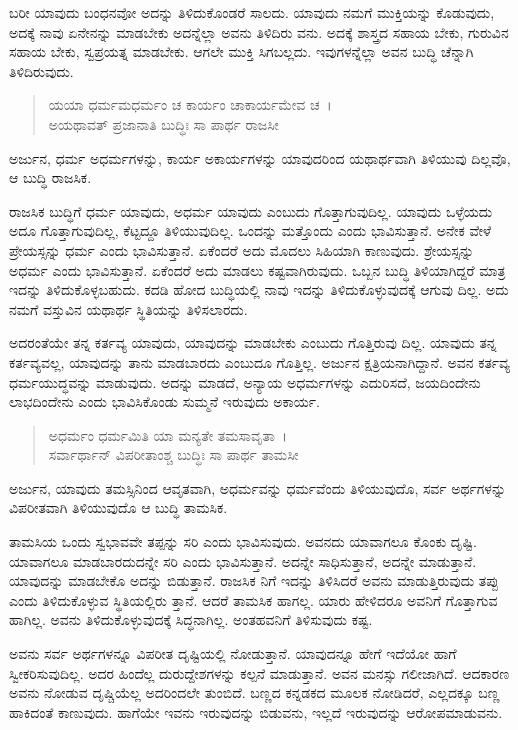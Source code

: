 ಬರೀ ಯಾವುದು ಬಂಧನವೋ ಅದನ್ನು ತಿಳಿದುಕೊಂಡರೆ ಸಾಲದು. ಯಾವುದು ನಮಗೆ ಮುಕ್ತಿಯನ್ನು ಕೊಡುವುದು, ಅದಕ್ಕೆ ನಾವು ಏನೇನನ್ನು ಮಾಡಬೇಕು ಅದನ್ನೆಲ್ಲಾ ಅವನು ತಿಳಿದಿರು ವನು. ಅದಕ್ಕೆ ಶಾಸ್ತ್ರದ ಸಹಾಯ ಬೇಕು, ಗುರುವಿನ ಸಹಾಯ ಬೇಕು, ಸ್ವಪ್ರಯತ್ನ ಮಾಡಬೇಕು. ಆಗಲೇ ಮುಕ್ತಿ ಸಿಗಬಲ್ಲದು. ಇವುಗಳನ್ನೆಲ್ಲಾ ಅವನ ಬುದ್ಧಿ ಚೆನ್ನಾಗಿ ತಿಳಿದಿರುವುದು.

\begin{verse}
ಯಯಾ ಧರ್ಮಮಧರ್ಮಂ ಚ ಕಾರ್ಯಂ ಚಾಕಾರ್ಯಮೇವ ಚ~।\\ಅಯಥಾವತ್ ಪ್ರಜಾನಾತಿ ಬುದ್ಧಿಃ ಸಾ ಪಾರ್ಥ ರಾಜಸೀ 
\end{verse}

{\small ಅರ್ಜುನ, ಧರ್ಮ ಅಧರ್ಮಗಳನ್ನು, ಕಾರ್ಯ ಅಕಾರ್ಯಗಳನ್ನು ಯಾವುದರಿಂದ ಯಥಾರ್ಥವಾಗಿ ತಿಳಿಯುವು ದಿಲ್ಲವೊ, ಆ ಬುದ್ಧಿ ರಾಜಸಿಕ.}

ರಾಜಸಿಕ ಬುದ್ಧಿಗೆ ಧರ್ಮ ಯಾವುದು, ಅಧರ್ಮ ಯಾವುದು ಎಂಬುದು ಗೊತ್ತಾಗುವುದಿಲ್ಲ. ಯಾವುದು ಒಳ್ಳೆಯದು ಅದೂ ಗೊತ್ತಾಗುವುದಿಲ್ಲ, ಕೆಟ್ಟದ್ದೂ ತಿಳಿಯುವುದಿಲ್ಲ. ಒಂದನ್ನು ಮತ್ತೊಂದು ಎಂದು ಭಾವಿಸುತ್ತಾನೆ. ಅನೇಕ ವೇಳೆ ಪ್ರೇಯಸ್ಸನ್ನು ಧರ್ಮ ಎಂದು ಭಾವಿಸುತ್ತಾನೆ. ಏಕೆಂದರೆ ಅದು ಮೊದಲು ಸಿಹಿಯಾಗಿ ಕಾಣುವುದು. ಶ್ರೇಯಸ್ಸನ್ನು ಅಧರ್ಮ ಎಂದು ಭಾವಿಸುತ್ತಾನೆ. ಏಕೆಂದರೆ ಅದು ಮಾಡಲು ಕಷ್ಟವಾಗಿರುವುದು. ಒಬ್ಬನ ಬುದ್ಧಿ ತಿಳಿಯಾಗಿದ್ದರೆ ಮಾತ್ರ ಇದನ್ನು ತಿಳಿದುಕೊಳ್ಳಬಹುದು. ಕದಡಿ ಹೋದ ಬುದ್ಧಿಯಲ್ಲಿ ನಾವು ಇದನ್ನು ತಿಳಿದುಕೊಳ್ಳುವುದಕ್ಕೆ ಆಗುವು ದಿಲ್ಲ. ಅದು ನಮಗೆ ವಸ್ತುವಿನ ಯಥಾರ್ಥ ಸ್ಥಿತಿಯನ್ನು ತಿಳಿಸಲಾರದು.

ಅದರಂತೆಯೇ ತನ್ನ ಕರ್ತವ್ಯ ಯಾವುದು, ಯಾವುದನ್ನು ಮಾಡಬೇಕು ಎಂಬುದು ಗೊತ್ತಿರುವು ದಿಲ್ಲ. ಯಾವುದು ತನ್ನ ಕರ್ತವ್ಯವಲ್ಲ, ಯಾವುದನ್ನು ತಾನು ಮಾಡಬಾರದು ಎಂಬುದೂ ಗೊತ್ತಿಲ್ಲ. ಅರ್ಜುನ ಕ್ಷತ್ರಿಯನಾಗಿದ್ದಾನೆ. ಅವನ ಕರ್ತವ್ಯ ಧರ್ಮಯುದ್ಧವನ್ನು ಮಾಡುವುದು. ಅದನ್ನು ಮಾಡದೆ, ಅನ್ಯಾಯ ಅಧರ್ಮಗಳನ್ನು ಎದುರಿಸದೆ, ಜಯದಿಂದೇನು ಲಾಭದಿಂದೇನು ಎಂದು ಭಾವಿಸಿಕೊಂಡು ಸುಮ್ಮನೆ ಇರುವುದು ಅಕಾರ್ಯ.

\begin{verse}
ಅಧರ್ಮಂ ಧರ್ಮಮಿತಿ ಯಾ ಮನ್ಯತೇ ತಮಸಾವೃತಾ~।\\ಸರ್ವಾರ್ಥಾನ್ ವಿಪರೀತಾಂಶ್ಚ ಬುದ್ಧಿಃ ಸಾ ಪಾರ್ಥ ತಾಮಸೀ 
\end{verse}

{\small ಅರ್ಜುನ, ಯಾವುದು ತಮಸ್ಸಿನಿಂದ ಆವೃತವಾಗಿ, ಅಧರ್ಮವನ್ನು ಧರ್ಮವೆಂದು ತಿಳಿಯುವುದೊ, ಸರ್ವ ಅರ್ಥಗಳನ್ನು ವಿಪರೀತವಾಗಿ ತಿಳಿಯುವುದೊ ಆ ಬುದ್ಧಿ ತಾಮಸಿಕ.}

ತಾಮಸಿಯ ಒಂದು ಸ್ವಭಾವವೇ ತಪ್ಪನ್ನು ಸರಿ ಎಂದು ಭಾವಿಸುವುದು. ಅವನದು ಯಾವಾಗಲೂ ಕೊಂಕು ದೃಷ್ಟಿ. ಯಾವಾಗಲೂ ಮಾಡಬಾರದುದನ್ನೇ ಸರಿ ಎಂದು ಭಾವಿಸುತ್ತಾನೆ. ಅದನ್ನೇ ಸಾಧಿಸುತ್ತಾನೆ, ಅದನ್ನೇ ಮಾಡುತ್ತಾನೆ. ಯಾವುದನ್ನು ಮಾಡಬೇಕೊ ಅದನ್ನು ಬಿಡುತ್ತಾನೆ. ರಾಜಸಿಕ ನಿಗೆ ಇದನ್ನು ತಿಳಿಸಿದರೆ ಅವನು ಮಾಡುತ್ತಿರುವುದು ತಪ್ಪು ಎಂದು ತಿಳಿದುಕೊಳ್ಳುವ ಸ್ಥಿತಿಯಲ್ಲಿರು ತ್ತಾನೆ. ಆದರೆ ತಾಮಸಿಕ ಹಾಗಲ್ಲ. ಯಾರು ಹೇಳಿದರೂ ಅವನಿಗೆ ಗೊತ್ತಾಗುವ ಹಾಗಿಲ್ಲ. ಅವನು ತಿಳಿದುಕೊಳ್ಳುವುದಕ್ಕೆ ಸಿದ್ಧನಾಗಿಲ್ಲ. ಅಂತಹವನಿಗೆ ತಿಳಿಸುವುದು ಕಷ್ಟ.

ಅವನು ಸರ್ವ ಅರ್ಥಗಳನ್ನೂ ವಿಪರೀತ ದೃಷ್ಟಿಯಲ್ಲಿ ನೋಡುತ್ತಾನೆ. ಯಾವುದನ್ನೂ ಹೇಗೆ ಇದೆಯೋ ಹಾಗೆ ಸ್ವೀಕರಿಸುವುದಿಲ್ಲ. ಅದರ ಹಿಂದೆಲ್ಲ ದುರುದ್ದೇಶಗಳನ್ನು ಕಲ್ಪನೆ ಮಾಡುತ್ತಾನೆ. ಅವನ ಮನಸ್ಸು ಗಲೀಜಾಗಿದೆ. ಆದಕಾರಣ ಅವನು ನೋಡುವ ದೃಷ್ಚಿಯೆಲ್ಲ ಅದರಿಂದಲೇ ತುಂಬಿದೆ. ಬಣ್ಣದ ಕನ್ನಡಕದ ಮೂಲಕ ನೋಡಿದರೆ, ಎಲ್ಲದಕ್ಕೂ ಬಣ್ಣ ಹಾಕಿದಂತೆ ಕಾಣುವುದು. ಹಾಗೆಯೇ ಇವನು ಇರುವುದನ್ನು ಬಿಡುವನು, ಇಲ್ಲದೆ ಇರುವುದನ್ನು ಆರೋಪಮಾಡುವನು.

